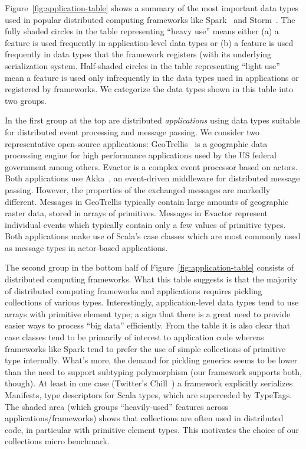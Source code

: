 \documentclass[preprint,10pt]{sigplanconf}
\theoremstyle{definition}
\theoremstyle{definition}
\begin{document}
Figure~\ref{fig:application-table} shows a summary of the most
important data types used in popular distributed computing frameworks
like Spark~\cite{Zaharia2012} and Storm~\cite{Storm}.
The fully shaded circles in the table representing ``heavy use'' means either
(a) a feature is used frequently in application-level data types or
(b) a feature is used frequently in data types that the framework registers
(with its underlying serialization system.
Half-shaded circles in the table representing ``light use'' mean a feature is used
only infrequently in the data types used in applications or registered by
frameworks. We categorize the data types shown in this table into two groups.

In the first group at the top are distributed \emph{applications}
using data types suitable for distributed event processing and message
passing. We consider two representative open-source applications:
GeoTrellis~\cite{GeoTrellis} is a geographic data
processing engine for high performance applications used by the US
federal government among others.  Evactor is a complex event processor
based on actors. Both applications use Akka~\cite{Akka}, an
event-driven middleware for distributed message passing. However, the
properties of the exchanged messages are markedly different. Messages
in GeoTrellis typically contain large amounts of geographic raster
data, stored in arrays of primitives. Messages in Evactor represent
individual events which typically contain only a few values of
primitive types. Both applications make use of Scala's case classes
which are most commonly used as message types in actor-based
applications.

The second group in the bottom half of Figure~\ref{fig:application-table}
consists of distributed computing {frameworks}. What this table
suggests is that the majority of distributed computing frameworks and
applications requires pickling collections of various
types. Interestingly, application-level data types tend to use arrays
with primitive element type; a sign that there is a great need to
provide easier ways to process ``big data'' efficiently. From the
table it is also clear that case classes tend to be primarily of
interest to application code whereas frameworks like Spark tend to
prefer the use of simple collections of primitive type
internally. What's more, the demand for pickling generics seems to be
lower than the need to support subtyping polymorphism (our framework
supports both, though). At least in one case (Twitter's Chill~\cite{TwitterChill}) a
framework explicitly serializes Manifests, type descriptors for Scala
types, which are superceded by TypeTags.
The shaded area (which groups ``heavily-used'' features across
applications/frameworks) shows that collections are often used in distributed
code, in particular with primitive element types. This motivates the choice of
our collections micro benchmark.
\end{document}
